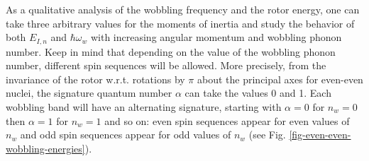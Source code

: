 As a qualitative analysis of the wobbling frequency and the rotor energy, one can take three arbitrary values for the moments of inertia and study the behavior of both $E_{I,n}$ and $\hbar\omega_w$ with increasing angular momentum and wobbling phonon number. Keep in mind that depending on the value of the wobbling phonon number, different spin sequences will be allowed. More precisely, from the invariance of the rotor w.r.t. rotations by $\pi$ about the principal axes for even-even nuclei, the signature quantum number $\alpha$ can take the values 0 and 1. Each wobbling band will have an alternating signature, starting with $\alpha=0$ for $n_w=0$ then $\alpha=1$ for $n_w=1$ and so on: even spin sequences appear for even values of $n_w$ and odd spin sequences appear for odd values of $n_w$ (see Fig. \ref{fig-even-even-wobbling-energies}).

